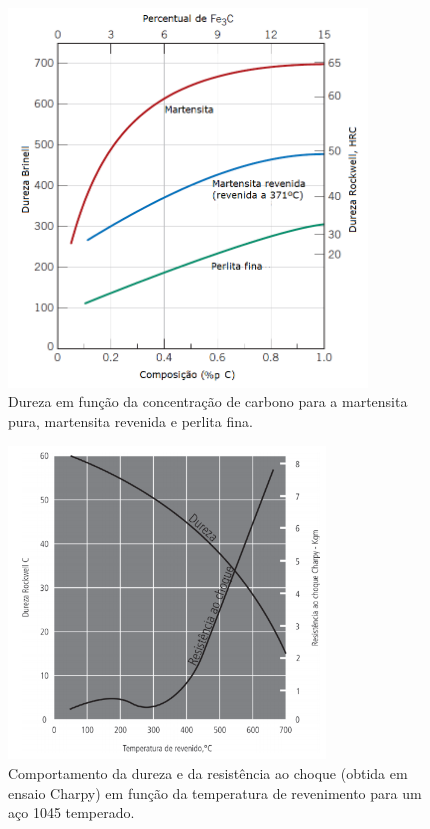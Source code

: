 \documentclass[
12pt,
openany, %
oneside, %
a4paper,			
english,			
brazil			        %
]{abntbibufjf}
\begin{document}
	\begin{figure}[H]
		\centering
		\includegraphics[width=0.85\textwidth]{martensita_revenida}
		\caption{Dureza em função da concentração de carbono para a martensita pura, martensita revenida e perlita fina. \cite{callister2011materials}}
		\label{fig:martensita_revenida}
	\end{figure}

	\begin{figure}[H]
		\centering
		\includegraphics[width=0.75\textwidth]{dureza_resistencia_revenido}
		\caption{Comportamento da dureza e da resistência ao choque (obtida em ensaio Charpy) em função da temperatura de revenimento para um aço 1045 temperado. \cite{vale2016tratamento}}
		\label{fig:dureza_resistencia_revenido}
	\end{figure}
	
\end{document}
